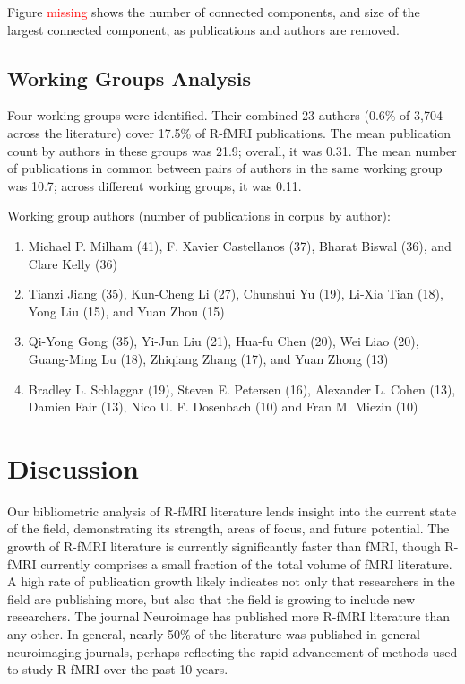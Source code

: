 \documentclass[5p]{elsarticle}
\begin{document}
Figure \textcolor{red}{missing} shows the number of connected components, and size of the largest
connected component, as publications and authors are removed.  

\subsection{Working Groups Analysis}
Four working groups were identified. Their
combined 23 authors (0.6\% of 3,704 across the literature) cover 17.5\% of R-fMRI
publications. The mean publication count by authors in these groups was 21.9;
overall, it was 0.31. The mean number of publications in common between pairs of
authors in the same working group was 10.7; across different working groups, it
was 0.11.  

Working group authors (number of publications in corpus by author):
\begin{enumerate}
\item Michael P. Milham (41), F. Xavier Castellanos (37), Bharat Biswal (36), and 
Clare Kelly (36)
\item Tianzi Jiang (35), Kun-Cheng Li (27), Chunshui Yu (19),
Li-Xia Tian (18), Yong Liu (15), and Yuan Zhou (15)
\item Qi-Yong Gong (35), Yi-Jun Liu (21), Hua-fu Chen (20), Wei Liao (20), 
Guang-Ming Lu (18), Zhiqiang Zhang (17), and Yuan Zhong (13) 
\item Bradley L. Schlaggar (19), Steven E. Petersen (16), Alexander L.
Cohen (13), Damien Fair (13), Nico U. F. Dosenbach (10) and Fran M. Miezin (10)
\end{enumerate}

\section{Discussion}

Our bibliometric analysis of R-fMRI literature lends insight into the current
state of the field, demonstrating its strength, areas of focus, and future
potential. The growth of R-fMRI literature is currently
significantly faster than fMRI, though R-fMRI currently comprises a small
fraction of the total volume of fMRI literature. A high
rate of publication growth likely indicates not only that researchers in the field are
publishing more, but also that the field is growing to include new researchers. 
The journal Neuroimage has published more R-fMRI literature than any
other. In general, nearly 50\% of the literature was published in general
neuroimaging journals, perhaps reflecting the rapid advancement of methods used
to study R-fMRI over the past 10 years. 
\end{document}
